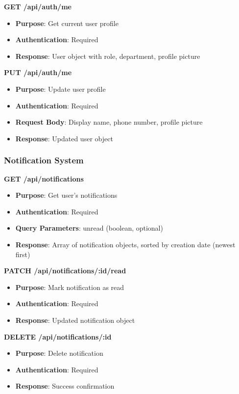 \documentclass[12pt,a4paper]{article}
\begin{document}
\textbf{GET /api/auth/me}
\begin{itemize}
    \item \textbf{Purpose}: Get current user profile
    \item \textbf{Authentication}: Required
    \item \textbf{Response}: User object with role, department, profile picture
\end{itemize}

\textbf{PUT /api/auth/me}
\begin{itemize}
    \item \textbf{Purpose}: Update user profile
    \item \textbf{Authentication}: Required
    \item \textbf{Request Body}: Display name, phone number, profile picture
    \item \textbf{Response}: Updated user object
\end{itemize}

\subsubsection{Notification System}

\textbf{GET /api/notifications}
\begin{itemize}
    \item \textbf{Purpose}: Get user's notifications
    \item \textbf{Authentication}: Required
    \item \textbf{Query Parameters}: unread (boolean, optional)
    \item \textbf{Response}: Array of notification objects, sorted by creation date (newest first)
\end{itemize}

\textbf{PATCH /api/notifications/:id/read}
\begin{itemize}
    \item \textbf{Purpose}: Mark notification as read
    \item \textbf{Authentication}: Required
    \item \textbf{Response}: Updated notification object
\end{itemize}

\textbf{DELETE /api/notifications/:id}
\begin{itemize}
    \item \textbf{Purpose}: Delete notification
    \item \textbf{Authentication}: Required
    \item \textbf{Response}: Success confirmation
\end{itemize}
\end{document}
